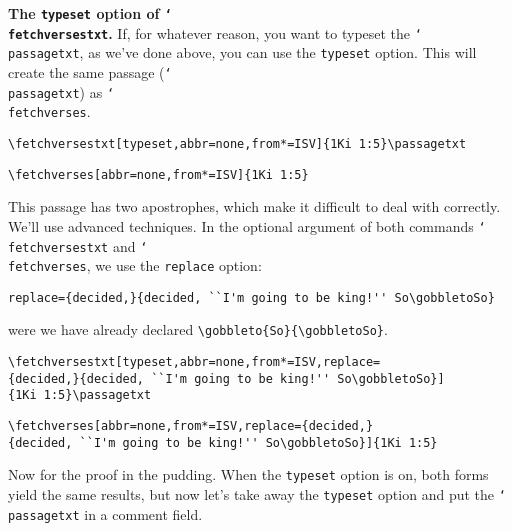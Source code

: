 \documentclass{article}
\def\cs#1{\texttt{\char`\\#1}}
\begin{document}
\medskip\noindent
\textbf{The \texttt{typeset} option of \cs{fetchversestxt}.} If, for whatever reason, you want
to typeset the \cs{passagetxt}, as we've done above, you can use the
\texttt{typeset} option. This will create the same passage (\cs{passagetxt})
as \cs{fetchverses}.

\medskip\goodbreak\noindent
\verb~\fetchversestxt[typeset,abbr=none,from*=ISV]{1Ki 1:5}\passagetxt~\\[3pt]
\bDQ\eSQ{}\passagetxt

\medskip\noindent
\verb~\fetchverses[abbr=none,from*=ISV]{1Ki 1:5}~\\[3pt]
\bDQ\eSQ{}

\medskip
This passage has two apostrophes, which make it difficult to deal with
correctly. We'll use advanced techniques. In the optional argument of both
commands \cs{fetchversestxt} and \cs{fetchverses}, we use the
\texttt{replace} option:
\begin{flushleft}\small
\quad\verb~replace={decided,}{decided, ``I'm going to be king!'' So\gobbletoSo}~
\end{flushleft} were we have already declared
\verb~\gobbleto{So}{\gobbletoSo}~.

\medskip\noindent
{}
\verb~\fetchversestxt[typeset,abbr=none,from*=ISV,replace=~\\
\verb~{decided,}{decided, ``I'm going to be king!'' So\gobbletoSo}]~\\
\verb~{1Ki 1:5}\passagetxt~\\[3pt]
\bDQ\eSQ{}\passagetxt

\medskip\noindent
\verb~\fetchverses[abbr=none,from*=ISV,replace={decided,}~\\
\verb~{decided, ``I'm going to be king!'' So\gobbletoSo}]{1Ki 1:5}~\\[3pt]
\bDQ\eSQ{}

\medskip
Now for the proof in the pudding. When the \texttt{typeset} option is on,
both forms yield the same results, but now let's take away the
\texttt{typeset} option and put the \cs{passagetxt} in a comment
field.
\pdfmargincomment[author={\versetxt}]{\passagetxt}
\end{document}
